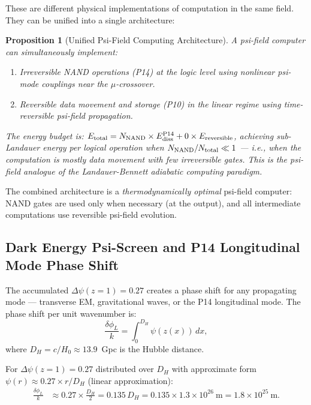 \documentclass[11pt]{article}
\newtheorem{proposition}[theorem]{Proposition}
\theoremstyle{definition}
\theoremstyle{remark}
\newcommand{\ee}[1]{\times 10^{#1}}
\begin{document}
These are different physical implementations of computation in the same field.
They can be unified into a single architecture:

\begin{proposition}[Unified Psi-Field Computing Architecture]
A psi-field computer can simultaneously implement:
\begin{enumerate}
\item \emph{Irreversible NAND operations} (P14) at the logic level using
  nonlinear psi-mode couplings near the $\mu$-crossover.
\item \emph{Reversible data movement and storage} (P10) in the linear regime
  using time-reversible psi-field propagation.
\end{enumerate}
The energy budget is: $E_{\rm total} = N_{\rm NAND} \times
E_{\rm diss}^{\rm P14} + 0 \times E_{\rm reversible}$, achieving
sub-Landauer energy per logical operation when $N_{\rm NAND}/N_{\rm total}
\ll 1$ --- i.e., when the computation is mostly data movement with few
irreversible gates. This is the psi-field analogue of the Landauer-Bennett
adiabatic computing paradigm.
\end{proposition}

The combined architecture is a \emph{thermodynamically optimal} psi-field
computer: NAND gates are used only when necessary (at the output), and all
intermediate computations use reversible psi-field evolution.

\subsection{Dark Energy Psi-Screen and P14 Longitudinal Mode Phase Shift}
\label{sec:screen-phase}

The accumulated $\Delta\psi(z=1) = 0.27$ creates a phase shift for any
propagating mode --- transverse EM, gravitational waves, or the P14
longitudinal mode. The phase shift per unit wavenumber is:
\begin{equation}
\frac{\delta\phi_L}{k} = \int_0^{D_H} \psi(z(x))\,dx,
\end{equation}
where $D_H = c/H_0 \approx 13.9$~Gpc is the Hubble distance.

For $\Delta\psi(z=1) = 0.27$ distributed over $D_H$ with approximate
form $\psi(r) \approx 0.27 \times r/D_H$ (linear approximation):
\begin{align}
\frac{\delta\phi_L}{k} &\approx 0.27 \times \frac{D_H}{2} = 0.135\,D_H
= 0.135 \times 1.3\ee{26}~\text{m} = 1.8\ee{25}~\text{m}.
\end{align}
\end{document}
